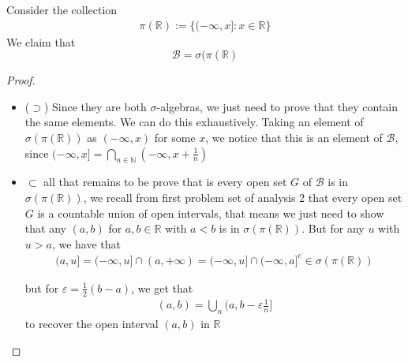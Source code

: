 \documentclass[12pt]{article}
\theoremstyle{definition}
\begin{document}
Consider the collection 
\begin{align*}
	\pi(\mathbb{R}) := \{ (-\infty, x] \colon x \in \mathbb{R}\}
\end{align*}
We claim that \[\mathcal{B} = \sigma(\pi(\mathbb{R})\]
\begin{proof}
	\begin{itemize}
		\item ($\supset$) Since they are both $\sigma$-algebras, we just need to prove that they contain the same elements. We can do this exhaustively.  Taking an element of $\sigma(\pi(\mathbb{R}))$ as $(-\infty, x)$ for some $x$, we notice that this is an element of $\mathcal{B}$, since $(-\infty, x] =\bigcap_{n \in \mathbb{N}} \left(-\infty, x+\frac{1}{n}\right)$
		\item $\subset$ all that remains to be prove that is every open set $G$ of $\mathcal{B}$ is in $\sigma(\pi(\mathbb{R}))$, we recall from first problem set of analysis 2 that every open set $G$ is a countable union of open intervals, that means we just need to show that any $(a,b)$ for $a,b \in \mathbb{R}$ with $a< b$ is in $\sigma(\pi(\mathbb{R}))$. But for any $u$ with $u > a$, we have that 
			\begin{align*}
				(a,u] =(-\infty,u] \cap (a,+\infty) = (-\infty,u] \cap (-\infty, a]^c \in \sigma(\pi(\mathbb{R}))
			\end{align*}

			but for $\varepsilon = \frac{1}{2}(b-a)$, we get that 
			\begin{align*}
				(a,b) = \bigcup_n (a,b-\varepsilon \frac{1}{n}]
			\end{align*}
			to recover the open interval $(a,b)$ in $\mathbb{R}$

	\end{itemize}	
\end{proof}
\end{document}
